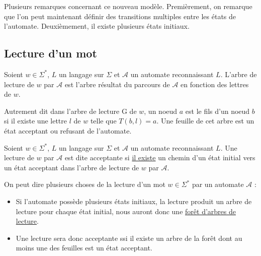 \begin{remark}
    Plusieurs remarques concernant ce nouveau modèle. Premièrement, on remarque que l'on peut maintenant définir 
    des transitions multiples entre les états de l'automate. Deuxièmement, il existe plusieurs états initiaux. 
\end{remark}

\subsection{Lecture d'un mot}

\begin{definition}
    Soient $w \in \Sigma^*$, $L$ un langage sur $\Sigma$ et $ \mathcal{A}$ un automate reconnaissant $L$.
    L'arbre de lecture de $w$ par $ \mathcal{A}$ est l'arbre résultat du parcours de $ \mathcal{A}$ en fonction 
    des lettres de $w$. 
    
    Autrement dit dans l'arbre de lecture G de $w$, un noeud $a$ est le fils d'un 
    noeud $b$ si il existe une lettre $l$ de $w$ telle que $T(b,l) = a$. Une feuille de cet arbre est un état acceptant 
    ou refusant de l'automate. 
\end{definition}

\begin{definition}
    Soient $w \in \Sigma^*$, $L$ un langage sur $\Sigma$ et $ \mathcal{A}$ un automate reconnaissant $L$. 
    Une lecture de $w$ par $ \mathcal{A}$ est dite acceptante si \underline{il existe} un chemin 
    d'un état initial vers un état acceptant dans l'arbre de lecture de $w$ par $ \mathcal{A}$. 
\end{definition}

\begin{proposition}
    On peut dire plusieurs choses de la lecture d'un mot $w \in \Sigma^*$ par un automate $ \mathcal{A}$ :
    \begin{itemize}
        \item Si l'automate possède plusieurs états initiaux, la lecture produit un arbre de lecture pour chaque 
        état initial, nous auront donc une \underline{forêt d'arbres de lecture}. 
        \item Une lecture sera donc acceptante ssi il existe un arbre de la forêt dont au moins une des feuilles
        est un état acceptant. 
    \end{itemize}
\end{proposition}

